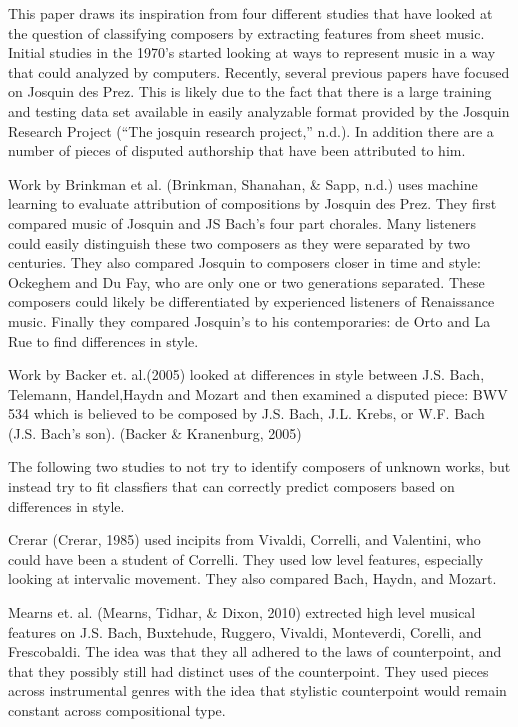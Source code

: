 \documentclass[12pt,twoside]{reedthesis}
\theoremstyle{definition}
\theoremstyle{definition}
\theoremstyle{definition}
\theoremstyle{remark}
\begin{document}
This paper draws its inspiration from four different studies that have
looked at the question of classifying composers by extracting features
from sheet music. Initial studies in the 1970's started looking at ways
to represent music in a way that could analyzed by computers. Recently,
several previous papers have focused on Josquin des Prez. This is likely
due to the fact that there is a large training and testing data set
available in easily analyzable format provided by the Josquin Research
Project (``The josquin research project,'' n.d.). In addition there are
a number of pieces of disputed authorship that have been attributed to
him.

Work by Brinkman et al. (Brinkman, Shanahan, \& Sapp, n.d.) uses machine
learning to evaluate attribution of compositions by Josquin des Prez.
They first compared music of Josquin and JS Bach's four part chorales.
Many listeners could easily distinguish these two composers as they were
separated by two centuries. They also compared Josquin to composers
closer in time and style: Ockeghem and Du Fay, who are only one or two
generations separated. These composers could likely be differentiated by
experienced listeners of Renaissance music. Finally they compared
Josquin's to his contemporaries: de Orto and La Rue to find differences
in style.

Work by Backer et. al.(2005) looked at differences in style between J.S.
Bach, Telemann, Handel,Haydn and Mozart and then examined a disputed
piece: BWV 534 which is believed to be composed by J.S. Bach, J.L.
Krebs, or W.F. Bach (J.S. Bach's son). (Backer \& Kranenburg, 2005)

The following two studies to not try to identify composers of unknown
works, but instead try to fit classfiers that can correctly predict
composers based on differences in style.

Crerar (Crerar, 1985) used incipits from Vivaldi, Correlli, and
Valentini, who could have been a student of Correlli. They used low
level features, especially looking at intervalic movement. They also
compared Bach, Haydn, and Mozart.

Mearns et. al. (Mearns, Tidhar, \& Dixon, 2010) extrected high level
musical features on J.S. Bach, Buxtehude, Ruggero, Vivaldi, Monteverdi,
Corelli, and Frescobaldi. The idea was that they all adhered to the laws
of counterpoint, and that they possibly still had distinct uses of the
counterpoint. They used pieces across instrumental genres with the idea
that stylistic counterpoint would remain constant across compositional
type.
\end{document}
